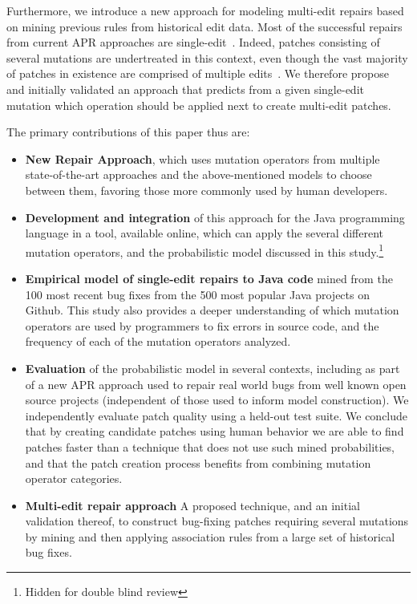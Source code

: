 \documentclass[conference]{IEEEtran}
\begin{document}
Furthermore, we introduce a new approach for modeling multi-edit repairs based on
mining previous rules from historical edit data. Most of the
successful repairs from current APR approaches are
single-edit~\cite{Weimer13,Qi15,kim2013,arcuri11}.  
%
Indeed, patches
consisting of several mutations are undertreated in this context, even though the vast majority
of patches in existence are comprised of multiple edits~\cite{Soto16,zhong15}.
We therefore
 propose and initially validated an approach that predicts from a given 
single-edit mutation which operation should be applied
next to create multi-edit patches. 


The primary contributions of this paper thus are:
\begin{itemize}
	\item \textbf{New Repair Approach}, which uses mutation operators
    from multiple state-of-the-art approaches and
    the above-mentioned models to choose between them, favoring those more commonly
    used by human developers.
    \item \textbf{Development and integration} of this approach for the Java programming language in a tool, available online, which can apply the several different mutation operators, and the probabilistic model discussed in this study.\footnote{Hidden for double blind review} %
    \item \textbf{Empirical model of single-edit repairs to Java code} mined
      from the 100 most recent bug fixes from the 500 most popular Java projects on
    Github. This study also provides a deeper
    understanding of which mutation operators are used by programmers to fix
    errors in source code, and the frequency of each of the mutation operators
    analyzed. 
  \item \textbf{Evaluation} of the probabilistic model in several
    contexts, including as part of a new APR approach used to repair real world bugs from well
    known open source projects (independent of those used to inform model
    construction). We independently evaluate patch quality using a held-out test
    suite. We conclude that by creating candidate patches using human behavior
    we are able to find patches faster than a technique that does not use such
    mined probabilities, and that the patch creation
    process benefits from combining mutation operator categories.  
  \item \textbf{Multi-edit repair approach} A proposed technique, and an initial
    validation thereof, to construct 
    bug-fixing patches requiring several mutations by mining and then applying association
    rules from a large set of historical bug fixes. 
\end{itemize}
\end{document}
